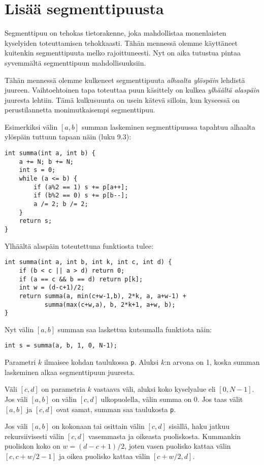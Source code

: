 \chapter{Lisää segmenttipuusta}

Segmenttipuu on tehokas tietorakenne,
joka mahdollistaa monenlaisten
kyselyiden toteuttamisen tehokkaasti.
Tähän mennessä olemme käyttäneet
kuitenkin segmenttipuuta melko rajoittuneesti.
Nyt on aika tutustua pintaa syvemmältä
segmenttipuun mahdollisuuksiin.

Tähän mennessä olemme kulkeneet segmenttipuuta
\textit{alhaalta ylöspäin} lehdistä juureen.
Vaihtoehtoinen tapa toteuttaa puun käsittely
on kulkea \textit{ylhäältä alaspäin} juuresta lehtiin.
Tämä kulkusuunta on usein kätevä silloin,
kun kyseessä on perustilannetta
monimutkaisempi segmenttipuu.

Esimerkiksi välin $[a,b]$ summan laskeminen
segmenttipuussa tapahtuu alhaalta ylöspäin 
tuttuun tapaan näin (luku 9.3):

\begin{lstlisting}
int summa(int a, int b) {
    a += N; b += N;
    int s = 0;
    while (a <= b) {
        if (a%2 == 1) s += p[a++];
        if (b%2 == 0) s += p[b--];
        a /= 2; b /= 2;
    }
    return s;
}
\end{lstlisting}
Ylhäältä alaspäin toteutettuna funktiosta tulee:

\begin{lstlisting}
int summa(int a, int b, int k, int c, int d) {
    if (b < c || a > d) return 0;
    if (a == c && b == d) return p[k];
    int w = (d-c+1)/2;
    return summa(a, min(c+w-1,b), 2*k, a, a+w-1) +
           summa(max(c+w,a), b, 2*k+1, a+w, b);
}
\end{lstlisting}
Nyt välin $[a,b]$ summan saa laskettua
kutsumalla funktiota näin:

\begin{lstlisting}
int s = summa(a, b, 1, 0, N-1);
\end{lstlisting}

Parametri $k$ ilmaisee kohdan
taulukossa \texttt{p}.
Aluksi $k$:n arvona on 1,
koska summan laskeminen alkaa
segmenttipuun juuresta.

Väli $[c,d]$ on parametria $k$ vastaava väli,
aluksi koko kyselyalue eli $[0,N-1]$.
Jos väli $[a,b]$ on välin $[c,d]$
ulkopuolella, välin summa on 0.
Jos taas välit $[a,b]$ ja $[c,d]$
ovat samat, summan saa taulukosta \texttt{p}.

Jos väli $[a,b]$ on kokonaan tai osittain välin $[c,d]$
sisällä, haku jatkuu rekursiivisesti
välin $[c,d]$ vasemmasta ja oikeasta puoliskosta.
Kummankin puoliskon koko on $w=(d-c+1)/2$,
joten vasen puolisko kattaa välin $[c,c+w/2-1]$
ja oikea puolisko kattaa välin $[c+w/2,d]$.


